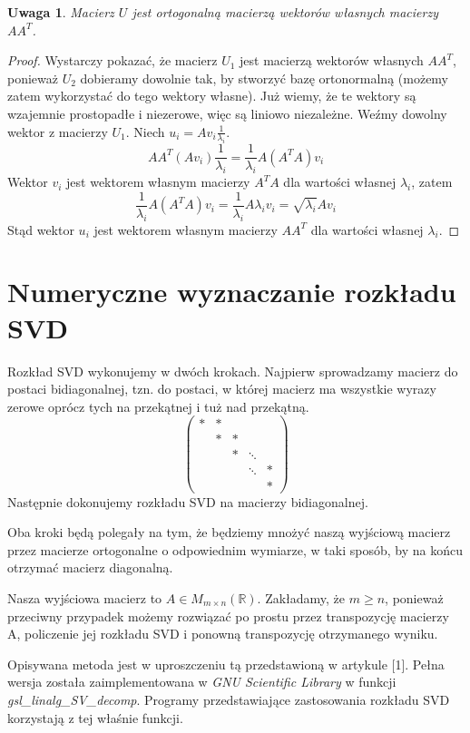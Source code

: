 \documentclass{article}
\newtheorem{att}[theorem]{Uwaga}
\theoremstyle{definition}
\begin{document}
\begin{att}
Macierz $U$ jest ortogonalną macierzą wektorów własnych macierzy $AA^T$.
\end{att}
\begin{proof}
Wystarczy pokazać, że macierz $U_1$ jest macierzą wektorów własnych $AA^T$, ponieważ $U_2$ dobieramy dowolnie tak, by stworzyć bazę ortonormalną (możemy zatem wykorzystać do tego wektory własne). Już wiemy, że te wektory są wzajemnie prostopadłe i niezerowe, więc są liniowo niezależne. Weźmy dowolny wektor z macierzy $U_1$. Niech $u_i = Av_i \frac{1}{\lambda_i}$.
$$ AA^T(Av_i) \frac{1}{\lambda_i} = \frac{1}{\lambda_i} A(A^TA)v_i $$
Wektor $v_i$ jest wektorem własnym macierzy $A^TA$ dla wartości własnej $\lambda_i$, zatem
$$ \frac{1}{\lambda_i} A(A^TA)v_i = \frac{1}{\lambda_i}A \lambda_i v_i = \sqrt{\lambda_i} Av_i $$
Stąd wektor $u_i$ jest wektorem własnym macierzy $AA^T$ dla wartości własnej $\lambda_i$.
\end{proof}

\section{Numeryczne wyznaczanie rozkładu SVD}
Rozkład SVD wykonujemy w dwóch krokach. Najpierw sprowadzamy macierz do postaci bidiagonalnej, tzn. do postaci, w której macierz ma wszystkie wyrazy zerowe oprócz tych na przekątnej i tuż nad przekątną.
$$ \begin{pmatrix} \ast & \ast & & & \\ & \ast & \ast & & \\ & & \ast & \ddots & \\ & & & \ddots & \ast \\ & & & & \ast \end{pmatrix} $$
Następnie dokonujemy rozkładu SVD na macierzy bidiagonalnej.

Oba kroki będą polegały na tym, że będziemy mnożyć naszą wyjściową macierz przez macierze ortogonalne o odpowiednim wymiarze, w taki sposób, by na końcu otrzymać macierz diagonalną.

Nasza wyjściowa macierz to $A \in M_{m \times n} (\mathbb{R})$. Zakładamy, że $m \geq n$, ponieważ przeciwny przypadek możemy rozwiązać po prostu przez transpozycję macierzy A, policzenie jej rozkładu SVD i ponowną transpozycję otrzymanego wyniku.

Opisywana metoda jest w uproszczeniu tą przedstawioną w artykule [1]. Pełna wersja została zaimplementowana w \textit{GNU Scientific Library} w funkcji \textit{gsl\_linalg\_SV\_decomp}. Programy przedstawiające zastosowania rozkładu SVD korzystają z tej właśnie funkcji.
\end{document}

